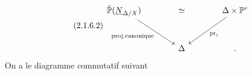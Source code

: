 \begin{equation}\tag{2.1.6.2}
\begin{tikzcd}[column sep=large, row sep=large]
\check{\mathbb{P}}(\underline{N}_{\Delta/X}) \arrow[rr, phantom, "\simeq"] \arrow[dr, "\text{proj.canonique}"'] & {} & \Delta \times \mathbb{P}^r \arrow[dl, "\mathrm{pr}_i"] \\
{} & \Delta & .
\end{tikzcd}
\end{equation}
On a le diagramme commutatif suivant

